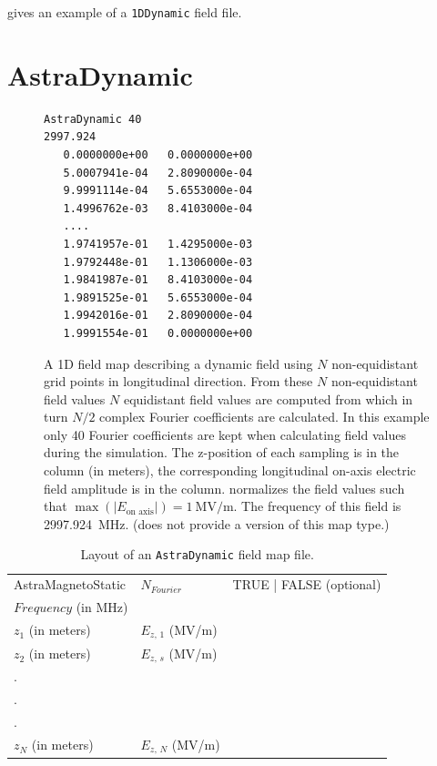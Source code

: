  gives an example of a \texttt{1DDynamic} field file.


\section{AstraDynamic}
\label{sec:AstraDynamic}
\begin{figure}[h]
\begin{fmpage}
\begin{verbatim}
AstraDynamic 40
2997.924
   0.0000000e+00   0.0000000e+00
   5.0007941e-04   2.8090000e-04
   9.9991114e-04   5.6553000e-04
   1.4996762e-03   8.4103000e-04
   ....
   1.9741957e-01   1.4295000e-03
   1.9792448e-01   1.1306000e-03
   1.9841987e-01   8.4103000e-04
   1.9891525e-01   5.6553000e-04
   1.9942016e-01   2.8090000e-04
   1.9991554e-01   0.0000000e+00
\end{verbatim}
\end{fmpage}
\caption[Example of an ASTRA compatible dynamic field map]{A 1D field map describing a dynamic field using $N$
  non-equidistant grid points in longitudinal direction. From these $N$ non-equidistant field values $N$ equidistant
  field values are computed from which in turn $N/2$ complex Fourier coefficients are calculated. In this example
  only 40 Fourier coefficients are kept when calculating field values during the simulation. The z-position of each
  sampling is in the  column (in meters), the corresponding longitudinal on-axis electric field amplitude
  is in the  column. \opalt normalizes the field values such that $\max(|E_{\text{on axis}}|) = \SI{1}{\mega\volt/\meter}$.
  The frequency of this field is \SI{2997.924}{\mega\hertz}. (\opalt does not provide a  version of this map type.)
}
\label{fig:AstraDynamic}
\end{figure}

\begin{table}[ht!]
    \caption{Layout of an \texttt{AstraDynamic} field map file.}
    \label{tab:AstraDynamic}
    \begin{center}
    \begin{tabular}{lll}
      \hline
      AstraMagnetoStatic & $N_{Fourier}$ & TRUE | FALSE (optional) \\
      $Frequency$ (in MHz) & & \\
      $z_{1}$ (in meters) & $E_{z,\,1}$ (MV/m) & \\
      $z_{2}$ (in meters) & $E_{z,\,s}$ (MV/m) & \\
      . & & \\
      . & & \\
      . & & \\
      $z_{N}$ (in meters) & $E_{z,\,N}$ (MV/m) & \\
      \hline
    \end{tabular}
    \end{center}
\end{table}

